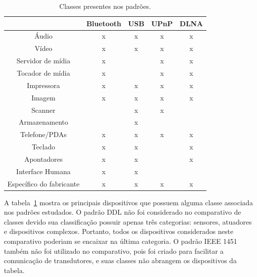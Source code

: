 \begin{table}
	\caption{Classes presentes nos padrões.}
	\begin{center}
		\begin{tabular}{|ccccc|}
		\hline
									& \textbf{Bluetooth} 	& \textbf{USB}	& \textbf{UPnP} & \textbf{DLNA}	\\
		\hline
		Áudio						& x						& x				& x 			& x				\\
		\hline
		Vídeo						& x						& x				& x				& x				\\
		\hline
		Servidor de mídia			& x						&				& x 			& x				\\
		\hline
		Tocador de mídia			& x						&				& x				& x				\\
		\hline
		Impressora 					& x						& x				& x				& x				\\
		\hline
		Imagem	 					& x						& x				& x				& x				\\
		\hline
		Scanner						& 						& x				& x				& 				\\
		\hline
		Armazenamento				&						& x				& 				& 				\\	
		\hline
		Telefone/PDAs				& x						& x				& x				& x				\\
		\hline
		Teclado						& x						& x				& 				& x				\\
		\hline
		Apontadores					& x						& x				& 				& x 			\\
		\hline
		Interface Humana		 	& x						& x				&  				&  				\\
		\hline
		Específico do fabricante 	& x 					& x				& x				& x				\\
		\hline								
		\end{tabular}
	\end{center}
	\label{tab:comparativoClasses}
\end{table}

A tabela~\ref{tab:comparativoClasses} mostra os principais dispositivos que possuem alguma classe associada nos padrões estudados. O padrão DDL não foi considerado no comparativo de classes devido sua classificação possuir apenas três categorias: sensores, atuadores e dispositivos complexos. Portanto, todos os dispositivos considerados neste comparativo poderiam se encaixar na última categoria. O padrão IEEE 1451 também não foi utilizado no comparativo, pois foi criado para facilitar a comunicação de transdutores, e suas classes não abrangem os dispositivos da tabela.

